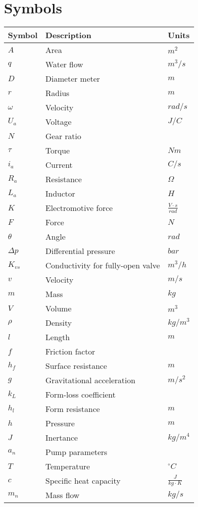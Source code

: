 \section*{Symbols}
\begin{longtable}[H]{p{80pt} p{280pt} p{50pt}} 
\textbf{Symbol}	& \textbf{Description} & \textbf{Units}  \\ \hline
$A$ & Area & $m^2$ \\ 
$q$ & Water flow & $m^3/s$ \\ 
$D$ & Diameter meter & $m$ \\ 
$r$ & Radius & $m$ \\ 
$\omega$ & Velocity & $rad/s$ \\ 
$U_a$ & Voltage & $J/C$ \\ 
$N$ & Gear ratio & $ $ \\ 
$\tau$ & Torque & $Nm$ \\ 
$i_a$ & Current & $C/s$ \\ 
$R_a$ & Resistance & $\Omega$ \\ 
$L_a$ & Inductor & $H$ \\ 
$K$ & Electromotive force & $\frac{V \cdot s}{rad}$ \\ 
$F$ & Force & $N$ \\ 
$\theta$ & Angle & $rad$ \\ 
$\Delta p$ & Differential pressure & $bar$ \\ 
$K_{vs}$ & Conductivity for fully-open valve & $m^3/h$ \\ 
$v$ & Velocity & $m/s$ \\ 
$m$ & Mass & $kg$ \\
$V$ & Volume & $m^3$ \\
$\rho$ & Density & $kg/m^3$ \\
$l$ & Length & $m$ \\
$f$ & Friction factor & $ $ \\
$h_f $ & Surface resistance & $m$ \\
$g$ & Gravitational acceleration & $m/s^2$ \\
$k_L$ & Form-loss coefficient & $ $ \\
$h_l$ & Form resistance & $m$ \\
$h$ & Pressure & $m$ \\
$J$ & Inertance & $kg/m^4$ \\
$a_n$ & Pump parameters & $ $ \\
$T$ & Temperature & $^{\circ}C$ \\
$c$ & Specific heat capacity & $\frac{J}{kg\cdot K}$ \\
$m_n$ & Mass flow & $kg/s$ \\








\end{longtable}


